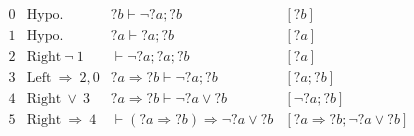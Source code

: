 \footnotesize
$\begin{array}{rlll}
0 & \text{Hypo.}~                  & {?b} \vdash \neg{?a}; {?b}                                    & [{?b}] \\
1 & \text{Hypo.}~                  & {?a} \vdash {?a}; {?b}                                        & [{?a}] \\
2 & \text{Right}~{\neg}~1          & \vdash \neg{?a}; {?a}; {?b}                                   & [{?a}] \\
3 & \text{Left}~{\Rightarrow}~2, 0 & {?a} \Rightarrow {?b} \vdash \neg{?a}; {?b}                   & [{?a}; {?b}] \\
4 & \text{Right}~{\lor}~3          & {?a} \Rightarrow {?b} \vdash \neg{?a} \lor {?b}               & [\neg{?a}; {?b}] \\
5 & \text{Right}~{\Rightarrow}~4   & \vdash ({?a} \Rightarrow {?b}) \Rightarrow \neg{?a} \lor {?b} & [{?a} \Rightarrow {?b}; \neg{?a} \lor {?b}]
\end{array}$
\normalsize
